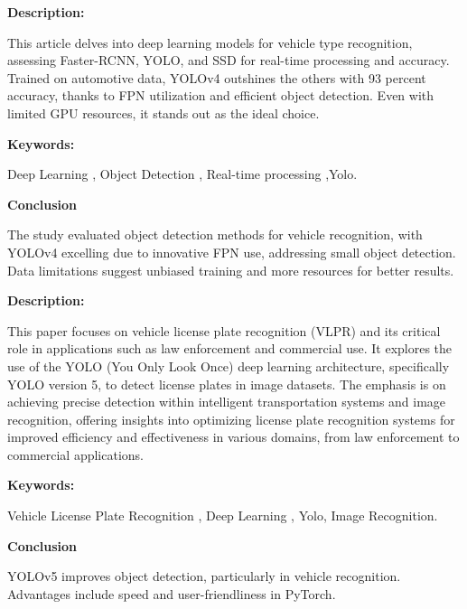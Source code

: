 
{ 
	
	\textbf{Description:}
	
	This article delves into deep learning models for vehicle type recognition, assessing Faster-RCNN, YOLO, and SSD for real-time processing and accuracy. Trained on automotive data, YOLOv4 outshines the others with 93 percent accuracy, thanks to FPN utilization and efficient object detection. Even with limited GPU resources, it stands out as the ideal choice.\autocite{Kim:2020}
	
	
	
	\textbf{Keywords:} 
	
	Deep Learning , Object Detection , Real-time processing ,Yolo.
	
	
	\textbf{Conclusion } 
	

	The study evaluated object detection methods for vehicle recognition, with YOLOv4 excelling due to innovative FPN use, addressing small object detection. Data limitations suggest unbiased training and more resources for better results.

	}




{ 
	
	\textbf{Description:}
	



	This paper focuses on vehicle license plate recognition (VLPR) and its critical role in applications such as law enforcement and commercial use. It explores the use of the YOLO (You Only Look Once) deep learning architecture, specifically YOLO version 5, to detect license plates in image datasets. The emphasis is on achieving precise detection within intelligent transportation systems and image recognition, offering insights into optimizing license plate recognition systems for improved efficiency and effectiveness in various domains, from law enforcement to commercial applications.\autocite{Aman:2021}


	
	
	
	\textbf{Keywords:} 
	
	Vehicle License Plate Recognition , Deep Learning , Yolo, Image Recognition.


	
	
	\textbf{Conclusion} 
	

	YOLOv5 improves object detection, particularly in vehicle recognition. Advantages include speed and user-friendliness in PyTorch.

	}



